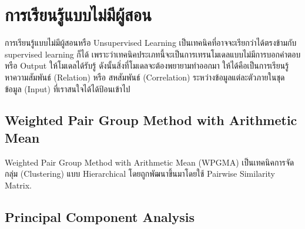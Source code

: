 

\chapter{การเรียนรู้แบบไม่มีผู้สอน}
\label{ch:unsup_ml}

การเรียนรู้แบบไม่มีผู้สอนหรือ Unsupervised Learning เป็นเทคนิคที่อาจจะเรียกว่าได้ตรงข้ามกับ supervised learning ก็ได้
เพราะว่าเทคนิคประเภทนี้จะเป็นการเทรนโมเดลแบบไม่มีการบอกคำตอบหรือ Output ให้โมเดลได้รับรู้ ดังนั้นสิ่งที่โมเดลจะต้องพยายามทำออกมา
ให้ได้คือเป็นการเรียนรู้หาความสัมพันธ์ (Relation) หรือ สหสัมพันธ์ (Correlation) ระหว่างข้อมูลแต่ละตัวภายในชุดข้อมูล (Input) 
ที่เราสนใจได้ได้ป้อนเข้าไป

\section{Weighted Pair Group Method with Arithmetic Mean}

Weighted Pair Group Method with Arithmetic Mean (WPGMA) เป็นเทคนิคการจัดกลุ่ม (Clustering) แบบ Hierarchical 
โดยถูกพัฒนาขึ้นมาโดยใช้ Pairwise Similarity Matrix.\cite{sokal1958} 

\section{Principal Component Analysis}

